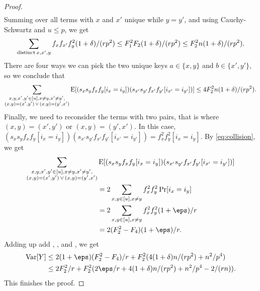 \begin{proof}
\begin{align*}
    \end{align*}    
    Summing over all terms with $x$ and $x'$ unique while $y=y'$, and
    using Cauchy-Schwartz and $u\leq p$, we get 
    \begin{align*}
        \sum_{{\rm distinct}\,x,x',y} f_xf_{x'}f_y^2 (1 + \delta) /(rp^2) 
            \le F_1^2 F_2 (1 + \delta)/(rp^2)
            \le F_2^2 n(1 + \delta)/(rp^2).
    \end{align*}
    There are four ways we can pick the two unique keys $a\in \{x,y\}$
    and $b\in \{x',y'\}$, so we conclude that
    \begin{equation}\label{eq:one-pair}
        \sum_{\substack{
            x,y,x',y'\in[u], x\neq y, x'\neq y',\\
            (x,y)=(x',y')\,\vee\,(x,y)=(y',x')
        }}
        \operatorname*{E}[(s_x s_y f_x f_y [i_x = i_y]) (s_{x'} s_{y'} f_{x'} f_{y'}[i_{x'} = i_{y'}])]
            \le 4 F_2^2 n(1 + \delta)/(rp^2) .
    \end{equation}
    Finally, we need to reconsider the terms with two pairs, that
    is where $(x,y)=(x',y')$ or $(x,y)=(y',x')$. In
    this case, $(s_x s_y f_x f_y [i_x = i_y]) (s_{x'} s_{y'} f_{x'} f_{y'}[i_{x'} = i_{y'}]) = f_x^2 f_y^2 [i_x = i_y]$.
    By \cref{eq:collision}, we get 
    \begin{equation}\begin{split}    
        \sum_{\substack{
            x,y,x',y'\in[u], x\neq y, x'\neq y',\\
            (x,y)=(x',y')\,\vee\,(x,y)=(y',x')
        }}&
            \E[(s_x s_y f_x f_y [i_x = i_y]) (s_{x'} s_{y'} f_{x'} f_{y'}[i_{x'} = i_{y'}])]
            \\&=2\sum_{x,y\in[u],x\neq y} f_x^2f_y^2 \Pr[i_x=i_y]
            \\&=2\sum_{x,y\in[u],x\neq y} f_x^2f_y^2 (1 + \eps)/r
            \\&=2(F_2^2 - F_4)(1 + \eps)/r .\label{eq:two-pairs}
    \end{split}\end{equation}
    Adding up add , , and
    , we get 
    \begin{align*}
        \Var[Y]
            &\le 2(1 + \eps)(F_2^2 - F_4)/r + F_2^2(4(1 + \delta) n / (rp^2) + n^2/p^4)
            \\&\le 2F_2^2/r + F_2^2 (2\eps/r + 4(1 + \delta)n / (rp^2) + n^2/p^4 - 2 /(rn)) .
    \end{align*}
    This finishes the proof.
\end{proof}

